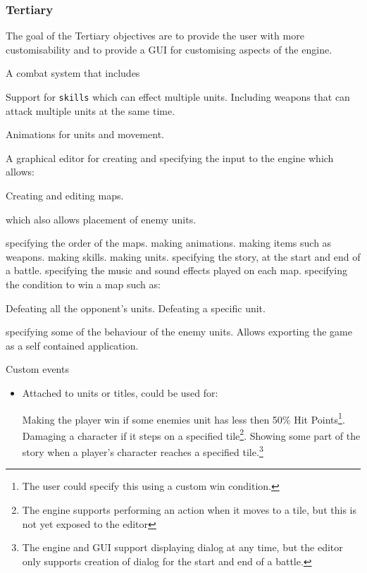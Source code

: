 \subsubsection{Tertiary} 
\label{tertiary}
The goal of the Tertiary objectives are to provide the user with more customisability and to provide a GUI for customising aspects of the engine. 

\begin{itemize}
	
	\tick A combat system that includes 
	\begin{itemize}
		\tick Support for \texttt{skills} which can effect multiple units.
		\tick Including weapons that can attack multiple units at the same time. 
	\end{itemize}
	
	\tick Animations for units and movement.
	
	\tick A graphical editor for  creating and specifying the input to the engine which allows:
	\begin{itemize}
		\tick   Creating and editing maps.
		\begin{itemize}
			\tick which also allows placement of enemy units.
		\end{itemize}
		
		\tick   specifying the order of the maps.
		\tick   making animations.
		\tick   making items such as weapons.
		\tick   making skills. 
		\tick   making units.
		\tick   specifying the story, at the start and end of a battle.
		\tick   specifying the music and sound effects played on each map.
		\tick   specifying the condition to win a map such as:
		 \begin{itemize}
		 	\tick Defeating all the opponent's units.
		 	\tick Defeating a specific unit.
		 \end{itemize}
		\tick   specifying some of the behaviour of the enemy units.
		\tick   Allows exporting the game as a self contained application.
	\end{itemize}
	
	\cross Custom events
	\begin{itemize}
		\item Attached to units or titles, could be used for:
		\begin{itemize}
			\partly Making the player win if some enemies unit has less then 50\% Hit Points\footnote{The user could specify this using a custom win condition.}.
			\partly Damaging a character if it steps on a specified tile\footnote{The engine supports performing an action when it moves to a tile, but this is not yet exposed to the editor}.
			\partly Showing some part of the story when a player's character reaches a specified tile.\footnote{The engine and GUI support displaying dialog at any time, but the editor only supports creation of dialog for the start and end of a battle.}
		\end{itemize}
	\end{itemize}
	
\end{itemize}